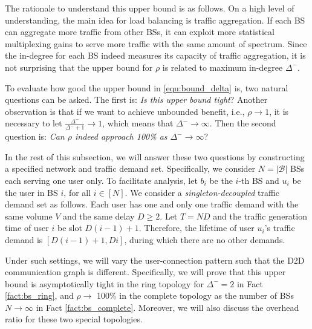 The rationale to understand this upper bound is as follows.
On a high level of understanding,
the main idea for load balancing is traffic aggregation.
If each BS can aggregate more traffic from other BSs, it can exploit more
statistical multiplexing gains to serve more traffic with the same amount of spectrum.
Since the in-degree for each BS indeed measures its capacity of traffic aggregation,
it is not surprising that the upper bound for $\rho$ is related to maximum in-degree $\Delta^-$.

To evaluate how good the upper bound in \eqref{equ:bound_delta} is, two natural questions can
be asked. The first is: \emph{Is this upper bound tight}?
Another observation is that if we want to achieve unbounded benefit,
i.e., $\rho \to 1$,
it is necessary to let $\frac{\Delta^-}{\Delta^-+1} \to 1$,
which means that $\Delta^- \to \infty$.
Then the second question is:
\emph{Can $\rho$ indeed approach 100\% as  $\Delta^- \to \infty$}?

In the rest of this subsection, we will answer these two questions
by  constructing a specified network and traffic demand set.
Specifically, we consider $N=|\mathcal{B}|$ BSs each serving one user only. To facilitate analysis, let
$b_i$ be the $i$-th BS and $u_i$ be the user in BS $i$, for
all $i\in[N]$. We consider a \emph{singleton-decoupled} traffic
demand set as follows. Each user has one and only one traffic
demand with the same volume $V$ and the same delay $D \ge 2$.
Let $T=ND$ and the traffic generation time of user $i$ be slot $D(i-1)+1$.
Therefore, the lifetime of user $u_i$'s traffic demand is $[D(i-1)+1,Di]$,
during which there are no other demands.

Under such settings, we will vary the user-connection pattern such that
the D2D communication graph is different.
Specifically, we will prove that this upper bound is asymptotically
tight in the ring topology for $\Delta^-=2$ in Fact \ref{fact:bs_ring},
and $\rho \to$ 100\% in the complete topology
as the number of BSs $N \to \infty$ in Fact \ref{fact:bs_complete}.
Moreover, we will also discuss the overhead ratio for these
two special topologies.

